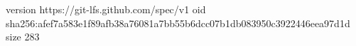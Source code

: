 version https://git-lfs.github.com/spec/v1
oid sha256:afef7a583e1f89afb38a76081a7bb55b6dcc07b1db083950c3922446eea97d1d
size 283
